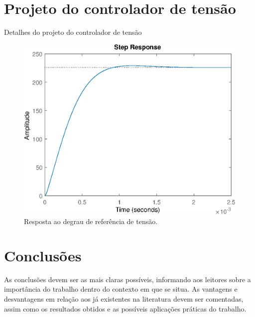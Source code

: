 \section{Projeto do controlador de tensão}
Detalhes do projeto do controlador de tensão


\begin{figure}
	\centering
	\includegraphics[width=0.8\linewidth]{Figs/StepResponse1malha}
	\caption{Resposta ao degrau de referência de tensão.}
	\label{fig:stepresponse1malha}
\end{figure}




\section{Conclusões} 


As conclusões devem ser as mais claras possíveis, informando aos leitores sobre a importância do trabalho dentro do contexto em que se situa. As vantagens e desvantagens em relação aos já existentes na literatura devem ser comentadas, assim como os resultados obtidos e as possíveis aplicações práticas do trabalho.





\balance


